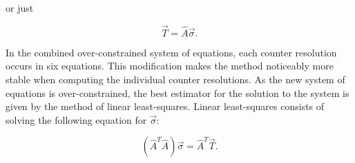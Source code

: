 or just

\begin{equation}
  \vec{T} = \hat{A} \vec{\sigma}.
\end{equation}

In the combined over-constrained system of equations, each counter
resolution occurs in six equations.  This modification makes the
method noticeably more stable when computing the individual counter
resolutions.  As the new system of equations is over-constrained, the
best estimator for the solution to the system is given by the method
of linear least-squares.  Linear least-squares consists of solving the
following equation for \(\vec{\sigma}\):

\begin{equation}
  (\hat{A}^T \hat{A}) \vec{\sigma} = \hat{A}^T \vec{T}.
\end{equation}

